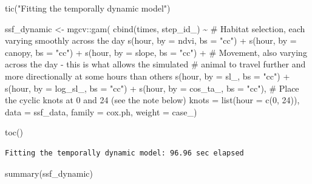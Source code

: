 \documentclass[
  letterpaper,
  DIV=11,
  numbers=noendperiod]{scrartcl}
\newenvironment{Shaded}{\begin{snugshade}}{\end{snugshade}}
\newcommand{\AttributeTok}[1]{\textcolor[rgb]{0.40,0.45,0.13}{#1}}
\newcommand{\CommentTok}[1]{\textcolor[rgb]{0.37,0.37,0.37}{#1}}
\newcommand{\DecValTok}[1]{\textcolor[rgb]{0.68,0.00,0.00}{#1}}
\newcommand{\FunctionTok}[1]{\textcolor[rgb]{0.28,0.35,0.67}{#1}}
\newcommand{\NormalTok}[1]{\textcolor[rgb]{0.00,0.23,0.31}{#1}}
\newcommand{\OtherTok}[1]{\textcolor[rgb]{0.00,0.23,0.31}{#1}}
\newcommand{\SpecialCharTok}[1]{\textcolor[rgb]{0.37,0.37,0.37}{#1}}
\newcommand{\StringTok}[1]{\textcolor[rgb]{0.13,0.47,0.30}{#1}}
\begin{document}
\begin{Shaded}
\begin{Highlighting}[]
\FunctionTok{tic}\NormalTok{(}\StringTok{"Fitting the temporally dynamic model"}\NormalTok{)}

\NormalTok{ssf\_dynamic }\OtherTok{\textless{}{-}}\NormalTok{ mgcv}\SpecialCharTok{::}\FunctionTok{gam}\NormalTok{(}
  \FunctionTok{cbind}\NormalTok{(times, step\_id\_) }\SpecialCharTok{\textasciitilde{}}
    \CommentTok{\# Habitat selection, each varying smoothly across the day}
    \FunctionTok{s}\NormalTok{(hour, }\AttributeTok{by =}\NormalTok{ ndvi,    }\AttributeTok{bs =} \StringTok{"cc"}\NormalTok{) }\SpecialCharTok{+}
    \FunctionTok{s}\NormalTok{(hour, }\AttributeTok{by =}\NormalTok{ canopy,  }\AttributeTok{bs =} \StringTok{"cc"}\NormalTok{) }\SpecialCharTok{+}
    \FunctionTok{s}\NormalTok{(hour, }\AttributeTok{by =}\NormalTok{ slope,   }\AttributeTok{bs =} \StringTok{"cc"}\NormalTok{) }\SpecialCharTok{+}
    \CommentTok{\# Movement, also varying across the day {-} this is what allows the simulated}
    \CommentTok{\# animal to travel further and more directionally at some hours than others}
    \FunctionTok{s}\NormalTok{(hour, }\AttributeTok{by =}\NormalTok{ sl\_,     }\AttributeTok{bs =} \StringTok{"cc"}\NormalTok{) }\SpecialCharTok{+}
    \FunctionTok{s}\NormalTok{(hour, }\AttributeTok{by =}\NormalTok{ log\_sl\_, }\AttributeTok{bs =} \StringTok{"cc"}\NormalTok{) }\SpecialCharTok{+}
    \FunctionTok{s}\NormalTok{(hour, }\AttributeTok{by =}\NormalTok{ cos\_ta\_, }\AttributeTok{bs =} \StringTok{"cc"}\NormalTok{),}
  \CommentTok{\# Place the cyclic knots at 0 and 24 (see the note below)}
  \AttributeTok{knots  =} \FunctionTok{list}\NormalTok{(}\AttributeTok{hour =} \FunctionTok{c}\NormalTok{(}\DecValTok{0}\NormalTok{, }\DecValTok{24}\NormalTok{)),}
  \AttributeTok{data   =}\NormalTok{ ssf\_data,}
  \AttributeTok{family =}\NormalTok{ cox.ph,}
  \AttributeTok{weight =}\NormalTok{ case\_)}

\FunctionTok{toc}\NormalTok{()}
\end{Highlighting}
\end{Shaded}

\begin{verbatim}
Fitting the temporally dynamic model: 96.96 sec elapsed
\end{verbatim}

\begin{Shaded}
\begin{Highlighting}[]
\FunctionTok{summary}\NormalTok{(ssf\_dynamic)}
\end{Highlighting}
\end{Shaded}
\end{document}
